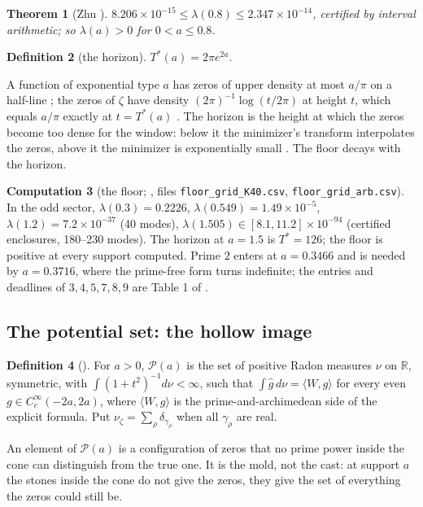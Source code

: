 \documentclass[11pt]{article}
\newtheorem{theorem}{Theorem}[section]
\theoremstyle{definition}
\newtheorem{definition}[theorem]{Definition}
\newtheorem{computation}[theorem]{Computation}
\theoremstyle{remark}
\newcommand{\R}{\mathbb R}
\newcommand{\Tst}{T^{*}}
\newcommand{\PS}{\mathcal P}
\begin{document}
\begin{theorem}[Zhu {\cite[Thm.\ 6.2]{zhu}}]\label{thm:zhu}
$8.206\times10^{-15}\le\lambda(0.8)\le2.347\times10^{-14}$, certified by interval arithmetic; so $\lambda(a)>0$ for $0<a\le0.8$.
\end{theorem}

\begin{definition}[the horizon]
$\Tst(a)=2\pi e^{2a}$.
\end{definition}
A function of exponential type $a$ has zeros of upper density at most $a/\pi$ on a half-line \cite{boas}; the zeros of $\zeta$ have density $(2\pi)^{-1}\log(t/2\pi)$ at height $t$, which equals $a/\pi$ exactly at $t=\Tst(a)$ \cite[\S1]{window}. The horizon is the height at which the zeros become too dense for the window: below it the minimizer's transform interpolates the zeros, above it the minimizer is exponentially small \cite[Computation 12.5]{folds}. The floor decays with the horizon.

\begin{computation}[the floor; {\cite{folds,window}}, files \texttt{floor\_grid\_K40.csv}, \texttt{floor\_grid\_arb.csv}]\label{comp:floor}
In the odd sector, $\lambda(0.3)=0.2226$, $\lambda(0.549)=1.49\times10^{-5}$, $\lambda(1.2)=7.2\times10^{-37}$ (40 modes), $\lambda(1.505)\in[8.1,11.2]\times10^{-94}$ (certified enclosures, 180--230 modes). The horizon at $a=1.5$ is $\Tst=126$; the floor is positive at every support computed. Prime $2$ enters at $a=0.3466$ and is needed by $a=0.3716$, where the prime-free form turns indefinite; the entries and deadlines of $3,4,5,7,8,9$ are Table 1 of \cite{folds}.
\end{computation}

\subsection{The potential set: the hollow image}
\begin{definition}[{\cite[Def.\ 2.1]{potential}}]
For $a>0$, $\PS(a)$ is the set of positive Radon measures $\nu$ on $\R$, symmetric, with $\int(1+t^2)^{-1}d\nu<\infty$, such that $\int\hat g\,d\nu=\langle W,g\rangle$ for every even $g\in C_c^\infty(-2a,2a)$, where $\langle W,g\rangle$ is the prime-and-archimedean side of the explicit formula. Put $\nu_\zeta=\sum_\rho\delta_{\gamma_\rho}$ when all $\gamma_\rho$ are real.
\end{definition}
An element of $\PS(a)$ is a configuration of zeros that no prime power inside the cone can distinguish from the true one. It is the mold, not the cast: at support $a$ the stones inside the cone do not give the zeros, they give the set of everything the zeros could still be.
\end{document}
